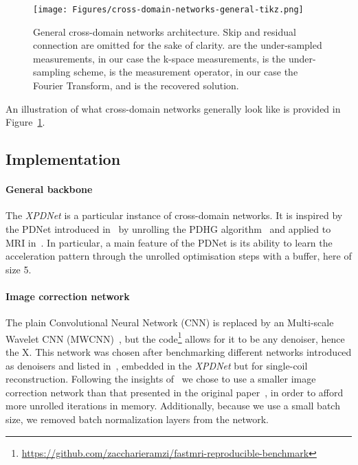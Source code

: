 \documentclass{article}
\begin{document}
\begin{figure}[h]
\centering
\texttt{[image: Figures/cross-domain-networks-general-tikz.png]}
\caption{
\label{fig:cd-net} 
General cross-domain networks architecture. Skip and residual connection are omitted for the sake of clarity.  are the under-sampled measurements, in our case the k-space measurements,  is the under-sampling scheme,  is the measurement operator, in our case the Fourier Transform, and  is the recovered solution.
}
\end{figure}

An illustration of what cross-domain networks generally look like is provided in Figure~\ref{fig:cd-net}.

\subsection{Implementation}

\paragraph{General backbone}The \emph{XPDNet} is a particular instance of cross-domain networks.
It is inspired by the PDNet introduced in~\citep{Adler2018} by unrolling the PDHG algorithm~\citep{Chambolle2011} and applied to MRI in~\citep{Ramzi2020BenchmarkingDatasets}.
In particular, a main feature of the PDNet is its ability to learn the acceleration pattern through the unrolled optimisation steps with a buffer, here of size 5.

\paragraph{Image correction network}The plain Convolutional Neural Network (CNN) is replaced by an Multi-scale Wavelet CNN (MWCNN)~\citep{Liu}, but the code\footnote{\url{https://github.com/zaccharieramzi/fastmri-reproducible-benchmark}} allows for it to be any denoiser, hence the X.
This network was chosen after benchmarking different networks introduced as denoisers and listed in~\citep{Tian2020DeepOverview}, embedded in the \emph{XPDNet} but for single-coil reconstruction.
Following the insights of~\citep{Ramzi2020BenchmarkingDatasets} we chose to use a smaller image correction network than that presented in the original paper~\citep{Liu}, in order to afford more unrolled iterations in memory.
Additionally, because we use a small batch size, we removed batch normalization layers from the network.
\end{document}
